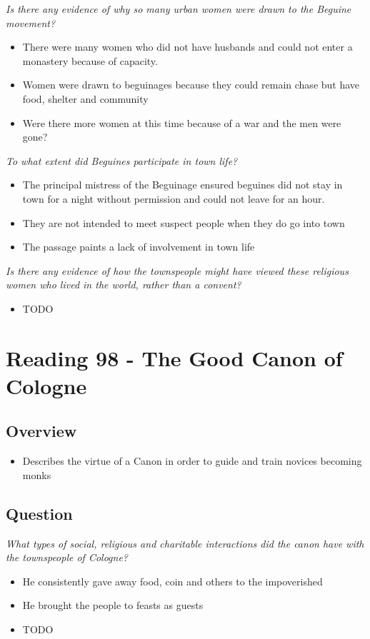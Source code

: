 \documentclass[12pt]{article}
\begin{document}
\textit{Is there any evidence of why so many urban women were drawn to the Beguine movement?}
\begin{itemize}
	\item There were many women who did not have husbands and could not enter a monastery because of capacity. 
	\item Women were drawn to beguinages because they could remain chase but have food, shelter and community
	\item Were there more women at this time because of a war and the men were gone?
\end{itemize}

\textit{To what extent did Beguines participate in town life?}
\begin{itemize}
	\item The principal mistress of the Beguinage ensured beguines did not stay in town for a night without permission and could not leave for an hour.
	\item They are not intended to meet suspect people when they do go into town
	\item The passage paints a lack of involvement in town life
\end{itemize}

\textit{Is there any evidence of how the townspeople might have viewed these religious women who lived in the world, rather than a convent?}
\begin{itemize}
	\item TODO
\end{itemize}

\section*{Reading 98 - The Good Canon of Cologne}

\subsection*{Overview}
\begin{itemize}
	\item Describes the virtue of a Canon in order to guide and train novices becoming monks
\end{itemize}

\subsection*{Question}
\textit{What types of social, religious and charitable interactions did the canon have with the townspeople of Cologne?}
\begin{itemize}
	\item He consistently gave away food, coin and others to the impoverished
	\item He brought the people to feasts as guests
	\item TODO
\end{itemize}
\end{document}
